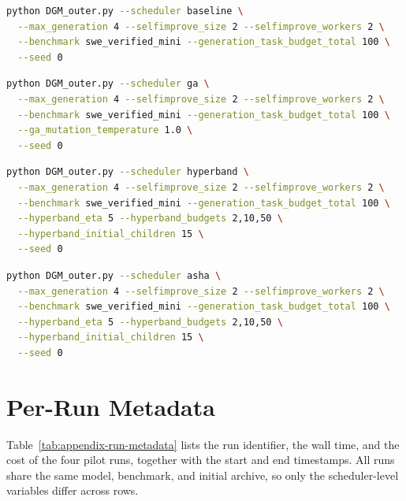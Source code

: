 \begin{lstlisting}[language=bash,caption={Baseline scheduler.},label={lst:run-baseline}]
python DGM_outer.py --scheduler baseline \
  --max_generation 4 --selfimprove_size 2 --selfimprove_workers 2 \
  --benchmark swe_verified_mini --generation_task_budget_total 100 \
  --seed 0
\end{lstlisting}

\begin{lstlisting}[language=bash,caption={Genetic Algorithm scheduler.},label={lst:run-ga}]
python DGM_outer.py --scheduler ga \
  --max_generation 4 --selfimprove_size 2 --selfimprove_workers 2 \
  --benchmark swe_verified_mini --generation_task_budget_total 100 \
  --ga_mutation_temperature 1.0 \
  --seed 0
\end{lstlisting}

\begin{lstlisting}[language=bash,caption={Hyperband scheduler.},label={lst:run-hyperband}]
python DGM_outer.py --scheduler hyperband \
  --max_generation 4 --selfimprove_size 2 --selfimprove_workers 2 \
  --benchmark swe_verified_mini --generation_task_budget_total 100 \
  --hyperband_eta 5 --hyperband_budgets 2,10,50 \
  --hyperband_initial_children 15 \
  --seed 0
\end{lstlisting}

\begin{lstlisting}[language=bash,caption={ASHA scheduler.},label={lst:run-asha}]
python DGM_outer.py --scheduler asha \
  --max_generation 4 --selfimprove_size 2 --selfimprove_workers 2 \
  --benchmark swe_verified_mini --generation_task_budget_total 100 \
  --hyperband_eta 5 --hyperband_budgets 2,10,50 \
  --hyperband_initial_children 15 \
  --seed 0
\end{lstlisting}

\section{Per-Run Metadata}
\label{app:run-metadata}

Table~\ref{tab:appendix-run-metadata} lists the run identifier, the
wall time, and the cost of the four pilot runs, together with the start
and end timestamps. All runs share the same model, benchmark, and
initial archive, so only the scheduler-level variables differ across
rows.

